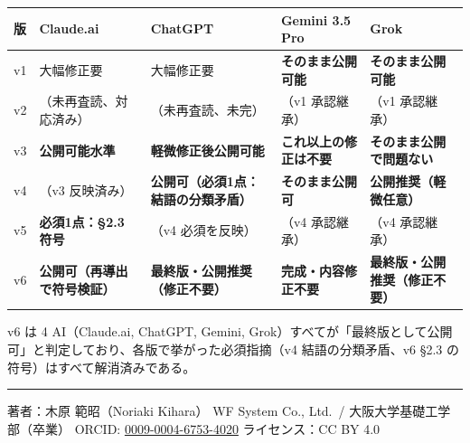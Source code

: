 \documentclass[
]{ltjsarticle}
\newcounter{none} %
\begin{document}
{\def\LTcaptype{none} %
\begin{longtable}[]{@{}
  >{\raggedright\arraybackslash}p{}
  >{\raggedright\arraybackslash}p{}
  >{\raggedright\arraybackslash}p{}
  >{\raggedright\arraybackslash}p{}
  >{\raggedright\arraybackslash}p{}@{}}
\toprule\noalign{}
\begin{minipage}[b]{\linewidth}\raggedright
版
\end{minipage} & \begin{minipage}[b]{\linewidth}\raggedright
Claude.ai
\end{minipage} & \begin{minipage}[b]{\linewidth}\raggedright
ChatGPT
\end{minipage} & \begin{minipage}[b]{\linewidth}\raggedright
Gemini 3.5 Pro
\end{minipage} & \begin{minipage}[b]{\linewidth}\raggedright
Grok
\end{minipage} \\
\midrule\noalign{}
\endhead
\bottomrule\noalign{}
\endlastfoot
v1 & 大幅修正要 & 大幅修正要 & \textbf{そのまま公開可能} &
\textbf{そのまま公開可能} \\
v2 & （未再査読、対応済み） & （未再査読、未完） & （v1 承認継承） &
（v1 承認継承） \\
v3 & \textbf{公開可能水準} & \textbf{軽微修正後公開可能} &
\textbf{これ以上の修正は不要} & \textbf{そのまま公開で問題ない} \\
v4 & （v3 反映済み） & \textbf{公開可（必須1点：結語の分類矛盾）} &
\textbf{そのまま公開可} & \textbf{公開推奨（軽微任意）} \\
v5 & \textbf{必須1点：§2.3 符号} & （v4 必須を反映） & （v4 承認継承） &
（v4 承認継承） \\
v6 & \textbf{公開可（再導出で符号検証）} &
\textbf{最終版・公開推奨（修正不要）} & \textbf{完成・内容修正不要} &
\textbf{最終版・公開推奨（修正不要）} \\
\end{longtable}
}

v6 は 4 AI（Claude.ai, ChatGPT, Gemini,
Grok）すべてが「最終版として公開可」と判定しており、各版で挙がった必須指摘（v4
結語の分類矛盾、v6 §2.3 の符号）はすべて解消済みである。

\begin{center}\rule{0.5\linewidth}{0.5pt}\end{center}

著者：木原 範昭（Noriaki Kihara） WF System Co., Ltd.~/
大阪大学基礎工学部（卒業） ORCID:
\href{https://orcid.org/0009-0004-6753-4020}{0009-0004-6753-4020}
ライセンス：CC BY 4.0
\end{document}
